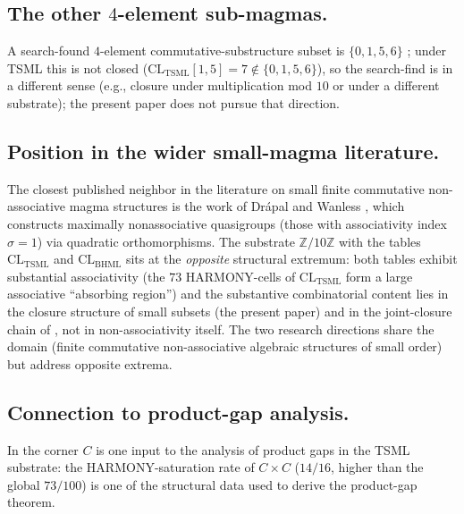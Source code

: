 \documentclass[11pt,reqno]{amsart}
\theoremstyle{plain}
\theoremstyle{definition}
\theoremstyle{remark}
\newcommand{\Z}{\mathbb{Z}}
\newcommand{\TSML}{\mathrm{TSML}}
\newcommand{\BHML}{\mathrm{BHML}}
\begin{document}
\subsection{The other $4$-element sub-magmas.}
A search-found $4$-element commutative-substructure subset is
$\{0, 1, 5, 6\}$ \cite{LensCatalog}; under TSML this is not closed
($\mathrm{CL}_\TSML[1, 5] = 7 \notin \{0,1,5,6\}$), so the search-find
is in a different sense (e.g., closure under multiplication mod $10$
or under a different substrate); the present paper does not pursue
that direction.

\subsection{Position in the wider small-magma literature.}
The closest published neighbor in the literature on small finite
commutative non-associative magma structures is the work of Drápal
and Wanless \cite{DrapalWanless2021}, which constructs maximally
nonassociative quasigroups (those with associativity index $\sigma = 1$)
via quadratic orthomorphisms.  The substrate $\Z/10\Z$ with the
tables $\mathrm{CL}_\TSML$ and $\mathrm{CL}_\BHML$ sits at the
\emph{opposite} structural extremum: both tables exhibit substantial
associativity (the $73$ HARMONY-cells of $\mathrm{CL}_\TSML$ form a
large associative ``absorbing region'') and the substantive
combinatorial content lies in the closure structure of small subsets
(the present paper) and in the joint-closure chain of
\cite{SandersGishFourCore}, not in non-associativity itself.  The two
research directions share the domain (finite commutative
non-associative algebraic structures of small order) but address
opposite extrema.

\subsection{Connection to product-gap analysis.}
In \cite{SandersGishProductGap} the corner $C$ is one input to the
analysis of product gaps in the TSML substrate: the
HARMONY-saturation rate of $C \times C$ ($14/16$, higher than the
global $73/100$) is one of the structural data used to derive the
product-gap theorem.
\end{document}
